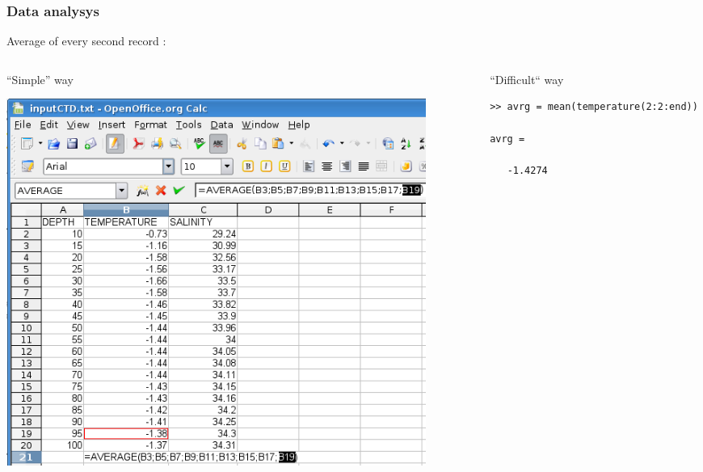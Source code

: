 \documentclass{beamer}
\begin{document}
\begin{frame}[fragile]
\frametitle{Data analysys} 
\begin{center}
Average of every second record :\\ \end{center}

\begin{columns}[t]
\begin{column}{.5\textwidth}
``Simple'' way


\includegraphics[width=0.9\textwidth,angle=00]{sprsh.png}

\end{column}
\begin{column}{.5\textwidth}
``Difficult`` way

\begin{lstlisting}
>> avrg = mean(temperature(2:2:end))

avrg =

   -1.4274
\end{lstlisting}
\end{column}
\end{columns}

\end{frame}
\end{document}
